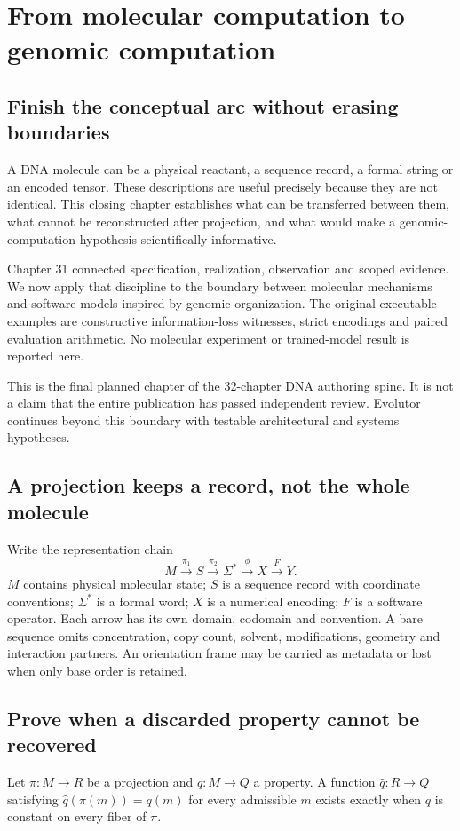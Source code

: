 \chapter{From molecular computation to genomic computation}
\label{ch:dna32}
\section{Finish the conceptual arc without erasing boundaries}
A DNA molecule can be a physical reactant, a sequence record, a formal string
or an encoded tensor. These descriptions are useful precisely because they
are not identical. This closing chapter establishes what can be transferred
between them, what cannot be reconstructed after projection, and what would
make a genomic-computation hypothesis scientifically informative.

Chapter 31 connected specification, realization, observation and scoped evidence.
We now apply that discipline to the boundary between molecular mechanisms and
software models inspired by genomic organization. The original executable
examples are constructive information-loss witnesses, strict encodings and
paired evaluation arithmetic. No molecular experiment or trained-model result
is reported here.

This is the final planned chapter of the 32-chapter DNA authoring spine.
It is not a claim that the entire publication has passed independent review.
Evolutor continues beyond this boundary with testable architectural and systems
hypotheses.

\section{A projection keeps a record, not the whole molecule}
Write the representation chain
\[
 M\xrightarrow{\pi_1}S\xrightarrow{\pi_2}\Sigma^*
 \xrightarrow{\phi}X\xrightarrow{F}Y.
\]
$M$ contains physical molecular state; $S$ is a sequence record with coordinate
conventions; $\Sigma^*$ is a formal word; $X$ is a numerical encoding; $F$ is a
software operator. Each arrow has its own domain, codomain and convention.
A bare sequence omits concentration, copy count, solvent, modifications,
geometry and interaction partners. An orientation frame may be carried as
metadata or lost when only base order is retained.

\section{Prove when a discarded property cannot be recovered}
Let $\pi:M\to R$ be a projection and $q:M\to Q$ a property. A function
$\widehat q:R\to Q$ satisfying $\widehat q(\pi(m))=q(m)$ for every admissible
$m$ exists exactly when $q$ is constant on every fiber of $\pi$.

